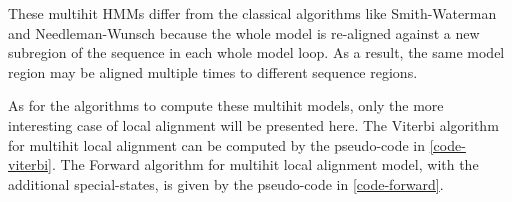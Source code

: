 These multihit HMMs differ from the classical algorithms like Smith-Waterman and Needleman-Wunsch because the whole model is re-aligned against a new subregion of the sequence in each whole model loop. As a result, the same model region may be aligned multiple times to different sequence regions.

As for the algorithms to compute these multihit models, only the more interesting case of local alignment will be presented here.
The Viterbi algorithm for multihit local alignment can be computed by the pseudo-code in \cref{code-viterbi}.
The Forward algorithm for multihit local alignment model, with the additional special-states, is given by the pseudo-code in \cref{code-forward}.


\clearpage
 



